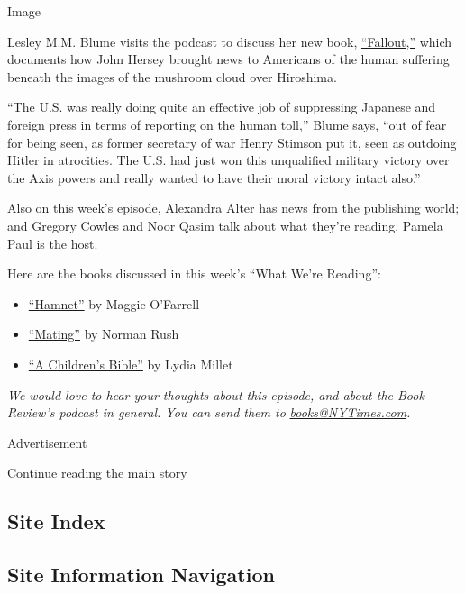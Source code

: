 Image

Lesley M.M. Blume visits the podcast to discuss her new book,
\href{https://www.nytimes3xbfgragh.onion/2020/08/04/books/review/fallout-hiroshima-hersey-lesley-m-m-blume.html}{``Fallout,''}
which documents how John Hersey brought news to Americans of the human
suffering beneath the images of the mushroom cloud over Hiroshima.

``The U.S. was really doing quite an effective job of suppressing
Japanese and foreign press in terms of reporting on the human toll,''
Blume says, ``out of fear for being seen, as former secretary of war
Henry Stimson put it, seen as outdoing Hitler in atrocities. The U.S.
had just won this unqualified military victory over the Axis powers and
really wanted to have their moral victory intact also.''

Also on this week's episode, Alexandra Alter has news from the
publishing world; and Gregory Cowles and Noor Qasim talk about what
they're reading. Pamela Paul is the host.

Here are the books discussed in this week's ``What We're Reading'':

\begin{itemize}
\item
  \href{https://www.nytimes3xbfgragh.onion/2020/07/17/books/review/hamnet-maggie-ofarrell.html}{``Hamnet''}
  by Maggie O'Farrell
\item
  \href{https://www.nytimes3xbfgragh.onion/1991/09/22/books/the-perfect-man-the-perfect-place-and-yet.html}{``Mating''}
  by Norman Rush
\item
  \href{https://www.nytimes3xbfgragh.onion/2020/05/08/books/review/a-childrens-bible-lydia-millet.html}{``A
  Children's Bible''} by Lydia Millet
\end{itemize}

\emph{We would love to hear your thoughts about this episode, and about
the Book Review's podcast in general. You can send them to}
\href{mailto:books@NYTimes.com}{\emph{books@NYTimes.com}}\emph{.}

Advertisement

\protect\hyperlink{after-bottom}{Continue reading the main story}

\hypertarget{site-index}{%
\subsection{Site Index}\label{site-index}}

\hypertarget{site-information-navigation}{%
\subsection{Site Information
Navigation}\label{site-information-navigation}}

